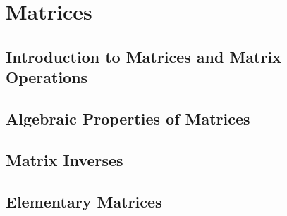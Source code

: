 \chapter{Matrices}
\section{Introduction to Matrices and Matrix Operations}

\newpage
\section{Algebraic Properties of Matrices}

\newpage
\section{Matrix Inverses}

\newpage
\section{Elementary Matrices}

